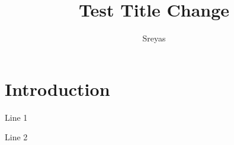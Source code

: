 \documentclass{beamer}
\title{Test Title Change}
\author{Sreyas}
\begin{document}
\maketitle

\section{Introduction}

\begin{frame}
  Line 1\pause

  Line 2
\end{frame}
\end{document}
